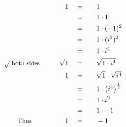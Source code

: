 \begin{alignat*}{5}
&\,&1\quad&=\quad&&1\\
&\,&\,&=&&1\cdot1\\
&\,&\,&=&&1\cdot(-1)^2\\
&\,&\,&=&&1\cdot(i^2)^2\\
&\,&\,&=&&1\cdot i^4\\
&\small\sqrt{}\text{ both sides}\qquad&\sqrt{1}\quad&=&&\sqrt{1\cdot i^4}\\
&\,&1\quad&=&&\sqrt{1}\cdot\sqrt{i^4}\\
&\,&\,&=&&1\cdot\left(i^4\right)^\frac{1}{2}\\
&\,&\,&=&&1\cdot i^2\\
&\,&\,&=&&1\cdot-1\\
&\qquad\small\text{Thus}&1\quad&=&&-1
\end{alignat*}
